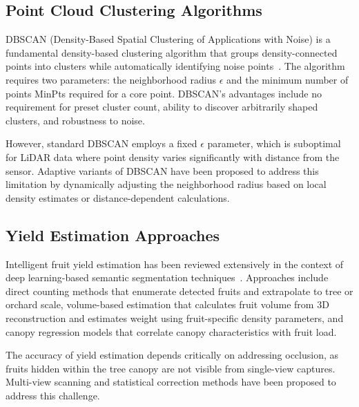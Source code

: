 \subsection{Point Cloud Clustering Algorithms}
DBSCAN (Density-Based Spatial Clustering of Applications with Noise) is a fundamental density-based clustering algorithm that groups density-connected points into clusters while automatically identifying noise points~\citep{Ester_1996}. The algorithm requires two parameters: the neighborhood radius $\epsilon$ and the minimum number of points MinPts required for a core point. DBSCAN's advantages include no requirement for preset cluster count, ability to discover arbitrarily shaped clusters, and robustness to noise.

However, standard DBSCAN employs a fixed $\epsilon$ parameter, which is suboptimal for LiDAR data where point density varies significantly with distance from the sensor. Adaptive variants of DBSCAN have been proposed to address this limitation by dynamically adjusting the neighborhood radius based on local density estimates or distance-dependent calculations.

\subsection{Yield Estimation Approaches}
Intelligent fruit yield estimation has been reviewed extensively in the context of deep learning-based semantic segmentation techniques~\citep{Maheswari_2021}. Approaches include direct counting methods that enumerate detected fruits and extrapolate to tree or orchard scale, volume-based estimation that calculates fruit volume from 3D reconstruction and estimates weight using fruit-specific density parameters, and canopy regression models that correlate canopy characteristics with fruit load.

The accuracy of yield estimation depends critically on addressing occlusion, as fruits hidden within the tree canopy are not visible from single-view captures. Multi-view scanning and statistical correction methods have been proposed to address this challenge.